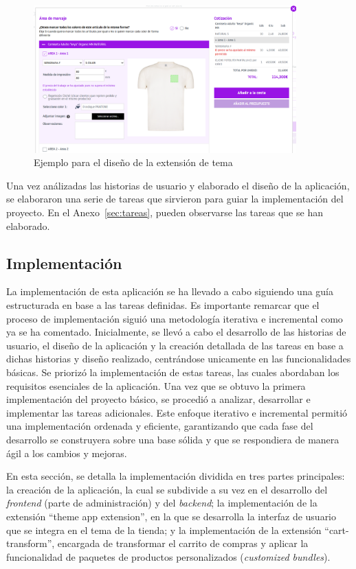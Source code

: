 \documentclass[12pt]{article}
\begin{document}
\begin{figure}[ht]
    \centering
    \includegraphics[width=0.9\textwidth]{imagenes-diseño/diseñoPersonalizador.png}
    \caption{\label{fig:disenoExtension}Ejemplo para el diseño de la extensión de tema}
    \vspace{\fill}
\end{figure}

Una vez análizadas las historias de usuario y elaborado el diseño de la aplicación, se elaboraron una serie de tareas que sirvieron para guiar la implementación del proyecto.
En el Anexo~\ref{sec:tareas}, pueden observarse las tareas que se han elaborado.

\clearpage
\subsection{Implementación}
La implementación de esta aplicación se ha llevado a cabo siguiendo una guía estructurada en base a las tareas definidas.
Es importante remarcar que el proceso de implementación siguió una metodología iterativa e incremental como ya se ha comentado. Inicialmente, se llevó a cabo el desarrollo
de las historias de usuario, el diseño de la aplicación y la creación detallada de las tareas en base a dichas historias y diseño realizado, centrándose unicamente en las funcionalidades básicas. Se priorizó
la implementación de estas tareas, las cuales abordaban los requisitos esenciales de la aplicación. Una vez que se obtuvo la primera implementación del
proyecto básico, se procedió a analizar, desarrollar e implementar las tareas adicionales. Este enfoque iterativo e incremental permitió una implementación
ordenada y eficiente, garantizando que cada fase del desarrollo se construyera sobre una base sólida y que se respondiera de manera ágil a los cambios y mejoras.

En esta sección, se detalla la implementación dividida en tres partes principales: la creación de la aplicación, 
la cual se subdivide a su vez en el desarrollo del \textit{frontend} (parte de administración) y del \textit{backend}; la implementación de la extensión 
``theme app extension'', en la que se desarrolla la interfaz de usuario que se integra en el tema de la tienda; y la implementación de 
la extensión ``cart-transform'', encargada de transformar el carrito de compras y aplicar la funcionalidad de paquetes de productos 
personalizados (\textit{customized bundles}).
\end{document}
